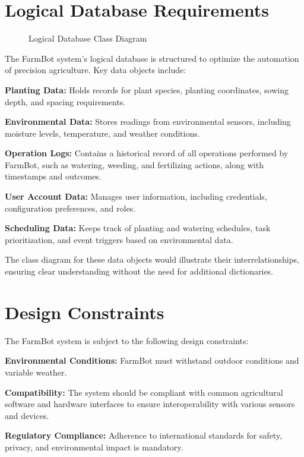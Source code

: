 \section{Logical Database Requirements}

\begin{figure}[H]
    \centering

\caption{Logical Database Class Diagram}
\end{figure}

The FarmBot system's logical database is structured to optimize the automation of precision agriculture. Key data objects include:

\textbf{Planting Data:} Holds records for plant species, planting coordinates, sowing depth, and spacing requirements.

\textbf{Environmental Data:} Stores readings from environmental sensors, including moisture levels, temperature, and weather conditions.

\textbf{Operation Logs:} Contains a historical record of all operations performed by FarmBot, such as watering, weeding, and fertilizing actions, along with timestamps and outcomes.

\textbf{User Account Data:} Manages user information, including credentials, configuration preferences, and roles.

\textbf{Scheduling Data:} Keeps track of planting and watering schedules, task prioritization, and event triggers based on environmental data.

The class diagram for these data objects would illustrate their interrelationships, ensuring clear understanding without the need for additional dictionaries.

\section{Design Constraints}
The FarmBot system is subject to the following design constraints:

\textbf{Environmental Conditions:} FarmBot must withstand outdoor conditions and variable weather.

\textbf{Compatibility:} The system should be compliant with common agricultural software and hardware interfaces to ensure interoperability with various sensors and devices.

\textbf{Regulatory Compliance:} Adherence to international standards for safety, privacy, and environmental impact is mandatory.

